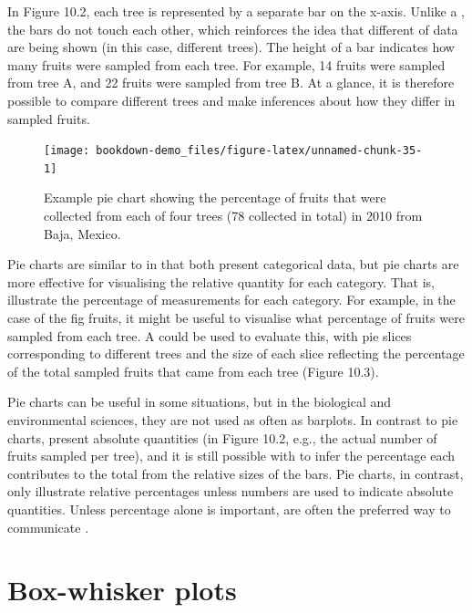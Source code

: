 \documentclass[
  openany]{krantz}
\begin{document}
In Figure 10.2, each tree is represented by a separate bar on the x-axis.
Unlike a , the bars do not touch each other, which reinforces the idea that different  of data are being shown (in this case, different trees).
The height of a bar indicates how many fruits were sampled from each tree.
For example, 14 fruits were sampled from tree A, and 22 fruits were sampled from tree B.
At a glance, it is therefore possible to compare different trees and make inferences about how they differ in sampled fruits.

\newpage

\begin{figure}
\texttt{[image: bookdown-demo\_files/figure-latex/unnamed-chunk-35-1]} \caption{Example pie chart showing the percentage of fruits that were collected from each of four trees (78 collected in total) in 2010 from Baja, Mexico.}\label{fig:unnamed-chunk-35}
\end{figure}

Pie charts are similar to  in that both present categorical data, but pie charts are more effective for visualising the relative quantity for each category.
That is,  illustrate the percentage of measurements for each category.
For example, in the case of the fig fruits, it might be useful to visualise what percentage of fruits were sampled from each tree.
A  could be used to evaluate this, with pie slices corresponding to different trees and the size of each slice reflecting the percentage of the total sampled fruits that came from each tree (Figure 10.3).

Pie charts can be useful in some situations, but in the biological and environmental sciences, they are not used as often as barplots.
In contrast to pie charts,  present absolute quantities (in Figure 10.2, e.g., the actual number of fruits sampled per tree), and it is still possible with  to infer the percentage each  contributes to the total from the relative sizes of the bars.
Pie charts, in contrast, only illustrate relative percentages unless numbers are used to indicate absolute quantities.
Unless percentage alone is important,  are often the preferred way to communicate .

\hypertarget{box-whisker-plots}{%
\section{Box-whisker plots}\label{box-whisker-plots}}
\end{document}
